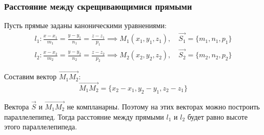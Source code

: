 \subsubsection{Расстояние между скрещивающимися прямыми}

Пусть прямые заданы каноническими уравнениями:
\begin{gather*}
  l_1: \frac{x - x_1}{m_1} = \frac{y - y_1}{n_1} = \frac{z - z_1}{p_1} \implies M_1(x_1, y_1, z_1), \quad \vec{S_1} = \{m_1, n_1, p_1\} \\
  l_2: \frac{x - x_2}{m_2} = \frac{y - y_2}{n_2} = \frac{z - z_2}{p_2} \implies M_2(x_2, y_2, z_2), \quad \vec{S_2} = \{m_2, n_2, p_2\}
\end{gather*}

Составим вектор $\overrightarrow{M_1M_2}$: \[
\overrightarrow{M_1M_2} = \{x_2 - x_1, y_2 - y_1, z_2 - z_1\} 
\] 

Вектора $\vec{S}$ и $\overrightarrow{M_1M_2}$ не компланарны. 
Поэтому на этих векторах можно построить параллелепипед.
Тогда расстояние между прямыми $l_1$ и $l_2$ будет равно высоте этого параллелепипеда.

